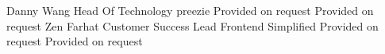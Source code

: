 
\begin{referees}
		{Danny Wang}
		{Head Of Technology}
		{preezie}
		{Provided on request}
		{Provided on request}
		{Zen Farhat}
		{Customer Success Lead}
		{Frontend Simplified}
		{Provided on request}
		{Provided on request}
\end{referees}